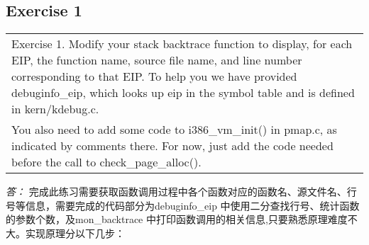 \documentclass[11pt,a4paper]{article}
\begin{document}
\subsection{Exercise 1}
\begin{tabular}{|p{\textwidth}|}
\hline
Exercise 1.  Modify your stack backtrace function to display, for each EIP, the function name, source file name, and line number corresponding to that EIP. To help you we have provided debuginfo\_eip, which looks up eip in the symbol table and is defined in kern/kdebug.c.\\
You also need to add some code to i386\_vm\_init()  in pmap.c, as indicated by comments there. For now, just add the code needed before the call to check\_page\_alloc(). \\
\hline
\end{tabular}
\textit{\large{答：}}
完成此练习需要获取函数调用过程中各个函数对应的函数名、源文件名、行号等信息，需要完成的代码部分为debuginfo\_eip 中使用二分查找行号、统计函数的参数个数，及mon\_backtrace 中打印函数调用的相关信息,只要熟悉原理难度不大。实现原理分以下几步：
\end{document}
